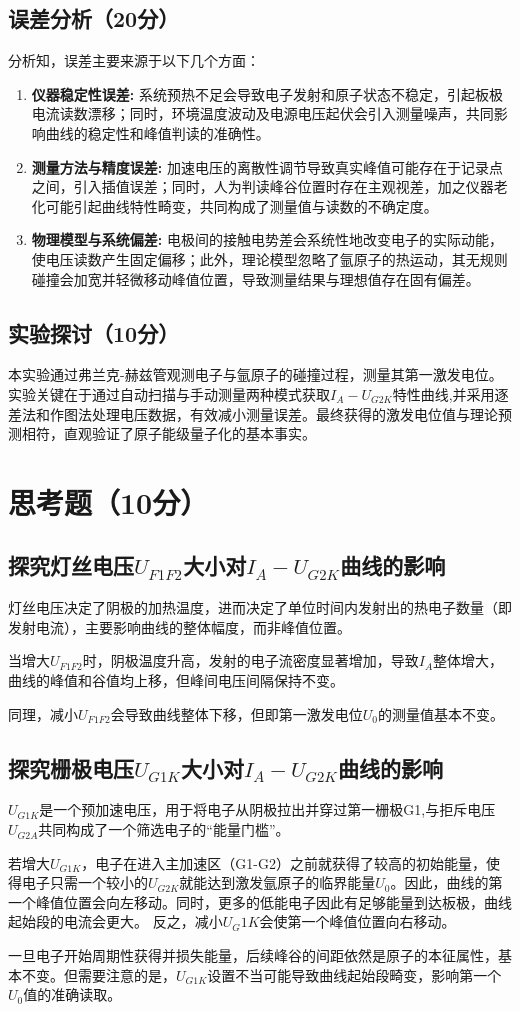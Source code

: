 \documentclass[]{../template/Report}%
\begin{document}
\begin{fullreportonly}
\subsection{误差分析（20分）}
分析知，误差主要来源于以下几个方面：
\begin{enumerate}
\item \textbf{仪器稳定性误差:} 系统预热不足会导致电子发射和原子状态不稳定，引起板极电流读数漂移；同时，环境温度波动及电源电压起伏会引入测量噪声，共同影响曲线的稳定性和峰值判读的准确性。
\item \textbf{测量方法与精度误差:} 加速电压的离散性调节导致真实峰值可能存在于记录点之间，引入插值误差；同时，人为判读峰谷位置时存在主观视差，加之仪器老化可能引起曲线特性畸变，共同构成了测量值与读数的不确定度。
\item \textbf{物理模型与系统偏差:} 电极间的接触电势差会系统性地改变电子的实际动能，使电压读数产生固定偏移；此外，理论模型忽略了氩原子的热运动，其无规则碰撞会加宽并轻微移动峰值位置，导致测量结果与理想值存在固有偏差。
\end{enumerate}
\subsection{实验探讨（10分）}
本实验通过弗兰克-赫兹管观测电子与氩原子的碰撞过程，测量其第一激发电位。实验关键在于通过自动扫描与手动测量两种模式获取$I_A-U_{G2K}$特性曲线,并采用逐差法和作图法处理电压数据，有效减小测量误差。最终获得的激发电位值与理论预测相符，直观验证了原子能级量子化的基本事实。
\section{思考题（10分）}
\subsection{探究灯丝电压$U_{F1F2}$大小对$I_A-U_{G2K}$曲线的影响}
灯丝电压决定了阴极的加热温度，进而决定了单位时间内发射出的热电子数量（即发射电流），主要影响曲线的整体幅度，而非峰值位置。
\par
当增大$U_{F1F2}$时，阴极温度升高，发射的电子流密度显著增加，导致$I_A$整体增大，曲线的峰值和谷值均上移，但峰间电压间隔保持不变。
\par
同理，减小$U_{F1F2}$会导致曲线整体下移，但即第一激发电位$U_0$的测量值基本不变。

\subsection{探究栅极电压$U_{G1K}$大小对$I_A-U_{G2K}$曲线的影响}
$U_{G1K}$是一个预加速电压，用于将电子从阴极拉出并穿过第一栅极G1,与拒斥电压$U_{G2A}$共同构成了一个筛选电子的“能量门槛”。
\par
若增大$U_{G1K}$，电子在进入主加速区（G1-G2）之前就获得了较高的初始能量，使得电子只需一个较小的$U_{G2K}$就能达到激发氩原子的临界能量$U_0$。因此，曲线的第一个峰值位置会向左移动。同时，更多的低能电子因此有足够能量到达板极，曲线起始段的电流会更大。
反之，减小$U_G1K$会使第一个峰值位置向右移动。
\par
一旦电子开始周期性获得并损失能量，后续峰谷的间距依然是原子的本征属性，基本不变。但需要注意的是，$U_{G1K}$设置不当可能导致曲线起始段畸变，影响第一个$U_0$值的准确读取。

\end{fullreportonly}
\end{document}
